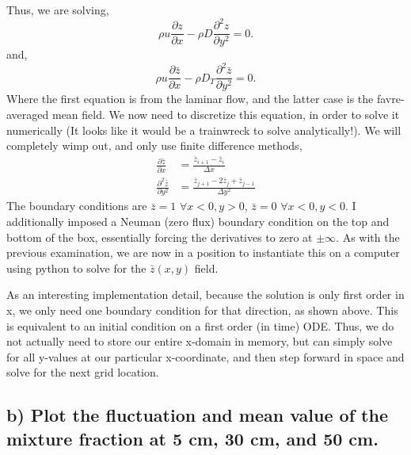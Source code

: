 \documentclass{article}
\begin{document}
Thus, we are solving, 
\begin{equation}
\rho u \frac{\partial z}{\partial x} - \rho D \frac{\partial^2
  z}{\partial y^2} = 0. 
\end{equation}
and, 
\begin{equation}
\rho u \frac{\partial \bar z}{\partial x} - \rho D_T \frac{\partial^2
  \bar z}{\partial y^2} = 0. 
\end{equation}
Where the first equation is from the laminar flow, and the latter case
is the favre-averaged mean field. We now need to discretize this equation, 
in order to solve it numerically (It looks like it would be a trainwreck to solve
analytically!). We will completely wimp out, and only use finite difference methods, 
\begin{align}
  \frac{\partial \bar z}{\partial x} &= \frac{\bar z_{i+1}-\bar z_{i}}{\Delta x} \\
  \label{first}
  \frac{\partial^2 \bar z}{\partial y^2} &= \frac{\bar z_{j+1}-2\bar z_{j}+\bar z_{j-1}}{\Delta y^2} 
\end{align}
The boundary conditions are $\bar z = 1$ $\forall x<0,y>0$, $\bar z = 0$ $\forall x<0,y<0$. 
I additionally imposed a Neuman (zero flux) boundary condition on the top and bottom of the box, 
essentially forcing the derivatives to zero at $\pm \infty$. As with the previous examination, 
we are now in a position to instantiate this on a computer using python to solve for 
the $\bar z(x,y)$ field. 

As an interesting implementation detail, because the solution is only
first order in x, we only need one boundary condition for that
direction, as shown above. This is equivalent to an initial condition on
a first order (in time) ODE. Thus, we do not actually need to store our
entire x-domain in memory, but can simply solve for all y-values at our
particular x-coordinate, and then step forward in space and solve for
the next grid location. 

%
%
%
%
\subsection*{b) Plot the fluctuation and mean value of the mixture fraction
  at 5 cm, 30 cm, and 50 cm.}
\end{document}
